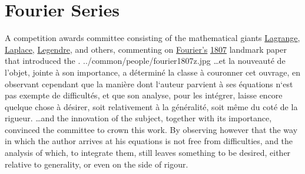 \chapter{Fourier Series}
\label{chp:fs}
\label{app:fs}
\qboxnpqt
  {
    A competition awards committee consisting of the 
    mathematical giants 
    \href{http://en.wikipedia.org/wiki/Joseph_Louis_Lagrange}{Lagrange}, 
    \href{http://en.wikipedia.org/wiki/Laplace}{Laplace}, 
    \href{http://en.wikipedia.org/wiki/Legendre}{Legendre}, and others,
    commenting on 
    \href{http://en.wikipedia.org/wiki/Joseph_Fourier}{Fourier's} 
    \href{http://en.wikipedia.org/wiki/1807}{1807} landmark paper
    \href{http://gallica.bnf.fr/ark:/12148/bpt6k33707/f220n7}
          {}
    that introduced the .
    \footnotemark
  }
  {../common/people/fourier1807z.jpg}
  { \ldots et la nouveaut\'e de l'objet, jointe \`a son importance, 
    a d\'etermin\'e la classe \`a couronner cet ouvrage, 
    en observant cependant que la mani\`ere dont l`auteur parvient 
    \`a ses \'equations n`est pas exempte de difficult\'es, et que son analyse, 
    pour les int\'egrer, laisse encore quelque chose \`a d\'esirer, 
    soit relativement \`a la g\'en\'eralit\'e, soit m\^eme du cot\'e de la rigueur.}
  { \ldots and the innovation of the subject, 
    together with its importance, 
    convinced the committee to crown this work.
    By observing however that the way in which the author arrives at his equations 
    is not free from difficulties, and the analysis of which, 
    to integrate them, still leaves something to be desired, 
    either relative to generality, or even on the side of rigour.}


